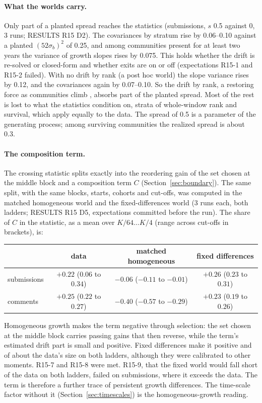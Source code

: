 \documentclass[10pt]{article}
\begin{document}
\paragraph{What the worlds carry.} Only part of a planted spread reaches the statistics (submissions, $s$ 0.5 against 0, 3 runs; RESULTS R15 D2). The covariances by stratum rise by 0.06--0.10 against a planted $(52\sigma_b)^2$ of 0.25, and among communities present for at least two years the variance of growth slopes rises by 0.075. This holds whether the drift is re-solved or closed-form and whether exits are on or off (expectations R15-1 and R15-2 failed). With no drift by rank (a post hoc world) the slope variance rises by 0.12, and the covariances again by 0.07--0.10. So the drift by rank, a restoring force as communities climb \cite{fik2013}, absorbs part of the planted spread. Most of the rest is lost to what the statistics condition on, strata of whole-window rank and survival, which apply equally to the data. The spread of 0.5 is a parameter of the generating process; among surviving communities the realized spread is about 0.3.
\paragraph{The composition term.} The crossing statistic splits exactly into the reordering gain of the set chosen at the middle block and a composition term $C$ (Section~\ref{sec:boundary}). The same split, with the same blocks, starts, cohorts and cut-offs, was computed in the matched homogeneous world and the fixed-differences world (3 runs each, both ladders; RESULTS R15 D5, expectations committed before the run). The share of $C$ in the statistic, as a mean over $K/64\ldots K/4$ (range across cut-offs in brackets), is:
\begin{center}\small\begin{tabular}{lccc}
\toprule
 & data & matched homogeneous & fixed differences\\
\midrule
submissions & $+0.22$ ($0.06$ to $0.34$) & $-0.06$ ($-0.11$ to $-0.01$) & $+0.26$ ($0.23$ to $0.31$)\\
comments & $+0.25$ ($0.22$ to $0.27$) & $-0.40$ ($-0.57$ to $-0.29$) & $+0.23$ ($0.19$ to $0.26$)\\
\bottomrule
\end{tabular}\end{center}
Homogeneous growth makes the term negative through selection: the set chosen at the middle block carries passing gains that then reverse, while the term's estimated drift part is small and positive. Fixed differences make it positive and of about the data's size on both ladders, although they were calibrated to other moments. R15-7 and R15-8 were met. R15-9, that the fixed world would fall short of the data on both ladders, failed on submissions, where it exceeds the data. The term is therefore a further trace of persistent growth differences. The time-scale factor without it (Section~\ref{sec:timescales}) is the homogeneous-growth reading.
\end{document}
